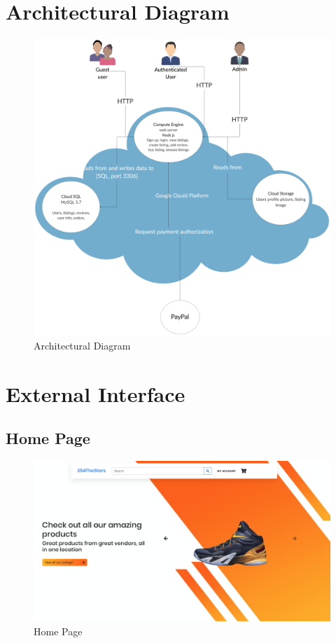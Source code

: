 \documentclass[11pt]{article}
\begin{document}
\section{Architectural Diagram}
\begin{figure}[ht!]
    \centering
    \includegraphics[width=\textwidth,height=0.6\paperheight]{Diagrams/Class/Architectural_diagram.png}
    \caption{Architectural Diagram}
    \label{fig: Architectural Diagram}
\end{figure}

\section{External Interface}
\subsection{Home Page}
\begin{figure}[ht!]
    \centering
    \includegraphics[width=\textwidth,height=0.4\paperheight]{Diagrams/External_Interfaces/Home_Page.png} %
    \caption{Home Page}
    \label{fig: Home Page}
\end{figure}
\end{document}
